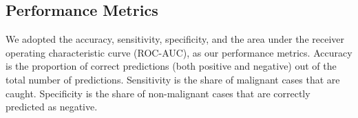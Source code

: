 \subsection{Performance Metrics}
\label{sec:metrics}

We adopted the accuracy, sensitivity, specificity, and the area under the receiver operating characteristic curve (ROC-AUC), as our performance metrics. Accuracy is the proportion of correct predictions (both positive and negative) out of the total number of predictions. Sensitivity is the share of malignant cases that are caught. Specificity is the share of non-malignant cases that are correctly predicted as negative. 
